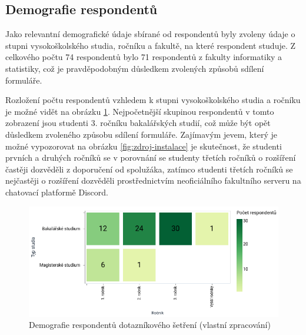 \subsection{Demografie respondentů}

Jako relevantní demografické údaje sbírané od respondentů byly zvoleny údaje o stupni vysokoškolského studia, ročníku a fakultě, na které respondent studuje. Z celkového počtu 74 respondentů bylo 71 respondentů z fakulty informatiky a statistiky, což je pravděpodobným důsledkem zvolených způsobů sdílení formuláře.

Rozložení počtu respondentů vzhledem k stupni vysokoškolského studia a ročníku je možné vidět na obrázku \ref{fig:demografie-respondentu}. Nejpočetnější skupinou respondentů v tomto zobrazení jsou studenti 3. ročníku bakalářských studií, což může být opět důsledkem zvoleného způsobu sdílení formuláře. Zajímavým jevem, který je možné vypozorovat na obrázku \ref{fig:zdroj-instalace} je skutečnost, že studenti prvních a druhých ročníků se v porovnání se studenty třetích ročníků o rozšíření častěji dozvěděli z doporučení od spolužáka, zatímco studenti třetích ročníků se nejčastěji o rozšíření dozvěděli prostřednictvím neoficiálního fakultního serveru na chatovací platformě Discord. 

\begin{figure}[htbp!]\centering
    \includegraphics[width=\textwidth]{img/demografie-respondentu.png}
    \caption{Demografie respondentů dotazníkového šetření (vlastní zpracování)}
    \label{fig:demografie-respondentu}
\end{figure}


